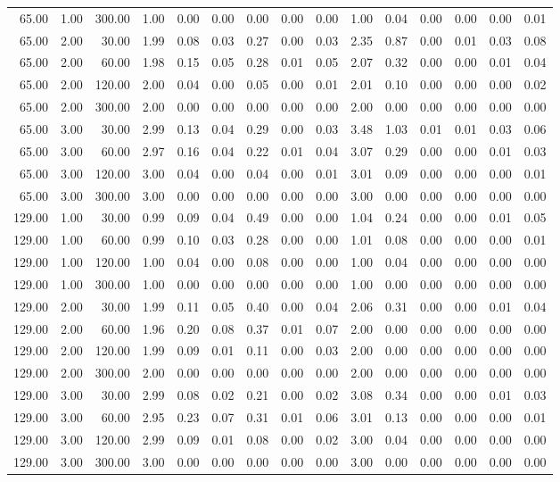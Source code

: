 \begin{table}[ht]
\begin{tabular}{rrrrrrrrrrrrrrr}
  65.00 & 1.00 & 300.00 & 1.00 & 0.00 & 0.00 & 0.00 & 0.00 & 0.00 & 1.00 & 0.04 & 0.00 & 0.00 & 0.00 & 0.01 \\ 
  65.00 & 2.00 & 30.00 & 1.99 & 0.08 & 0.03 & 0.27 & 0.00 & 0.03 & 2.35 & 0.87 & 0.00 & 0.01 & 0.03 & 0.08 \\ 
  65.00 & 2.00 & 60.00 & 1.98 & 0.15 & 0.05 & 0.28 & 0.01 & 0.05 & 2.07 & 0.32 & 0.00 & 0.00 & 0.01 & 0.04 \\ 
  65.00 & 2.00 & 120.00 & 2.00 & 0.04 & 0.00 & 0.05 & 0.00 & 0.01 & 2.01 & 0.10 & 0.00 & 0.00 & 0.00 & 0.02 \\ 
  65.00 & 2.00 & 300.00 & 2.00 & 0.00 & 0.00 & 0.00 & 0.00 & 0.00 & 2.00 & 0.00 & 0.00 & 0.00 & 0.00 & 0.00 \\ 
  65.00 & 3.00 & 30.00 & 2.99 & 0.13 & 0.04 & 0.29 & 0.00 & 0.03 & 3.48 & 1.03 & 0.01 & 0.01 & 0.03 & 0.06 \\ 
  65.00 & 3.00 & 60.00 & 2.97 & 0.16 & 0.04 & 0.22 & 0.01 & 0.04 & 3.07 & 0.29 & 0.00 & 0.00 & 0.01 & 0.03 \\ 
  65.00 & 3.00 & 120.00 & 3.00 & 0.04 & 0.00 & 0.04 & 0.00 & 0.01 & 3.01 & 0.09 & 0.00 & 0.00 & 0.00 & 0.01 \\ 
  65.00 & 3.00 & 300.00 & 3.00 & 0.00 & 0.00 & 0.00 & 0.00 & 0.00 & 3.00 & 0.00 & 0.00 & 0.00 & 0.00 & 0.00 \\ 
  129.00 & 1.00 & 30.00 & 0.99 & 0.09 & 0.04 & 0.49 & 0.00 & 0.00 & 1.04 & 0.24 & 0.00 & 0.00 & 0.01 & 0.05 \\ 
  129.00 & 1.00 & 60.00 & 0.99 & 0.10 & 0.03 & 0.28 & 0.00 & 0.00 & 1.01 & 0.08 & 0.00 & 0.00 & 0.00 & 0.01 \\ 
  129.00 & 1.00 & 120.00 & 1.00 & 0.04 & 0.00 & 0.08 & 0.00 & 0.00 & 1.00 & 0.04 & 0.00 & 0.00 & 0.00 & 0.00 \\ 
  129.00 & 1.00 & 300.00 & 1.00 & 0.00 & 0.00 & 0.00 & 0.00 & 0.00 & 1.00 & 0.00 & 0.00 & 0.00 & 0.00 & 0.00 \\ 
  129.00 & 2.00 & 30.00 & 1.99 & 0.11 & 0.05 & 0.40 & 0.00 & 0.04 & 2.06 & 0.31 & 0.00 & 0.00 & 0.01 & 0.04 \\ 
  129.00 & 2.00 & 60.00 & 1.96 & 0.20 & 0.08 & 0.37 & 0.01 & 0.07 & 2.00 & 0.00 & 0.00 & 0.00 & 0.00 & 0.00 \\ 
  129.00 & 2.00 & 120.00 & 1.99 & 0.09 & 0.01 & 0.11 & 0.00 & 0.03 & 2.00 & 0.00 & 0.00 & 0.00 & 0.00 & 0.00 \\ 
  129.00 & 2.00 & 300.00 & 2.00 & 0.00 & 0.00 & 0.00 & 0.00 & 0.00 & 2.00 & 0.00 & 0.00 & 0.00 & 0.00 & 0.00 \\ 
  129.00 & 3.00 & 30.00 & 2.99 & 0.08 & 0.02 & 0.21 & 0.00 & 0.02 & 3.08 & 0.34 & 0.00 & 0.00 & 0.01 & 0.03 \\ 
  129.00 & 3.00 & 60.00 & 2.95 & 0.23 & 0.07 & 0.31 & 0.01 & 0.06 & 3.01 & 0.13 & 0.00 & 0.00 & 0.00 & 0.01 \\ 
  129.00 & 3.00 & 120.00 & 2.99 & 0.09 & 0.01 & 0.08 & 0.00 & 0.02 & 3.00 & 0.04 & 0.00 & 0.00 & 0.00 & 0.00 \\ 
  129.00 & 3.00 & 300.00 & 3.00 & 0.00 & 0.00 & 0.00 & 0.00 & 0.00 & 3.00 & 0.00 & 0.00 & 0.00 & 0.00 & 0.00 \\ 
   \hline
\end{tabular}
\end{table}
